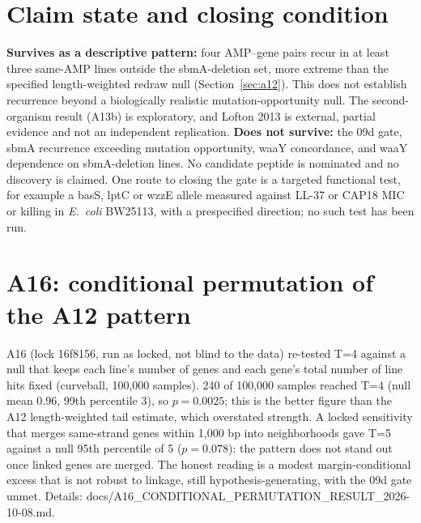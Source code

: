\documentclass[11pt,letterpaper]{article}
\begin{document}
\section{Claim state and closing condition}
\textbf{Survives as a descriptive pattern:} four AMP--gene pairs recur in at least three same-AMP lines outside the sbmA-deletion set, more extreme than the specified length-weighted redraw null (Section~\ref{sec:a12}). This does not establish recurrence beyond a biologically realistic mutation-opportunity null. The second-organism result (A13b) is exploratory, and Lofton 2013 is external, partial evidence and not an independent replication. \textbf{Does not survive:} the 09d gate, sbmA recurrence exceeding mutation opportunity, waaY concordance, and waaY dependence on sbmA-deletion lines. No candidate peptide is nominated and no discovery is claimed. One route to closing the gate is a targeted functional test, for example a basS, lptC or wzzE allele measured against LL-37 or CAP18 MIC or killing in \textit{E.\ coli} BW25113, with a prespecified direction; no such test has been run.

\section{A16: conditional permutation of the A12 pattern}
A16 (lock 16f8156, run as locked, not blind to the data) re-tested T=4 against a null that keeps each line's number of genes and each gene's total number of line hits fixed (curveball, 100{,}000 samples). 240 of 100{,}000 samples reached T=4 (null mean 0.96, 99th percentile 3), so $p=0.0025$; this is the better figure than the A12 length-weighted tail estimate, which overstated strength. A locked sensitivity that merges same-strand genes within 1{,}000 bp into neighborhoods gave T=5 against a null 95th percentile of 5 ($p=0.078$): the pattern does not stand out once linked genes are merged. The honest reading is a modest margin-conditional excess that is not robust to linkage, still hypothesis-generating, with the 09d gate unmet. Details: docs/A16\_CONDITIONAL\_PERMUTATION\_RESULT\_2026-10-08.md.
\end{document}
